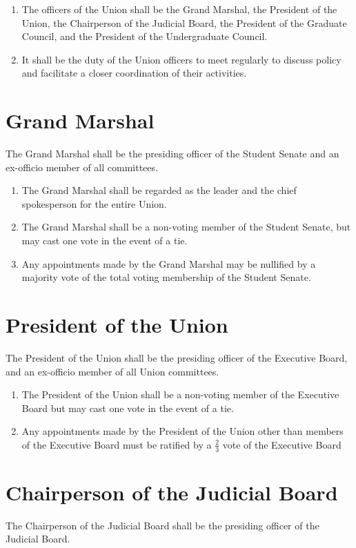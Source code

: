 \begin{enumerate}
\item The officers of the Union shall be the Grand Marshal, the President of the Union, the Chairperson of the Judicial Board, the President of the Graduate Council, and the President of the Undergraduate Council.
\item It shall be the duty of the Union officers to meet regularly to discuss policy and facilitate a closer coordination of their activities.
\end{enumerate}

\section{Grand Marshal}
The Grand Marshal shall be the presiding officer of the Student Senate and an ex-officio member of all committees.

\begin{enumerate}
\item The Grand Marshal shall be regarded as the leader and the chief spokesperson for the entire Union.
\item The Grand Marshal shall be a non-voting member of the Student Senate, but may cast one vote in the event of a tie.
\item Any appointments made by the Grand Marshal may be nullified by a majority vote of the total voting membership of the Student Senate.
\end{enumerate}

\section{President of the Union}
The President of the Union shall be the presiding officer of the Executive Board, and an ex-officio member of all Union committees.

\begin{enumerate}
\item The President of the Union shall be a non-voting member of the Executive Board but may cast one vote in the event of a tie.
\item Any appointments made by the President of the Union other than members of the Executive Board must be ratified by a $\frac{2}{3}$ vote of the Executive Board
\end{enumerate}

\section{Chairperson of the Judicial Board}
The Chairperson of the Judicial Board shall be the presiding officer of the Judicial Board.

